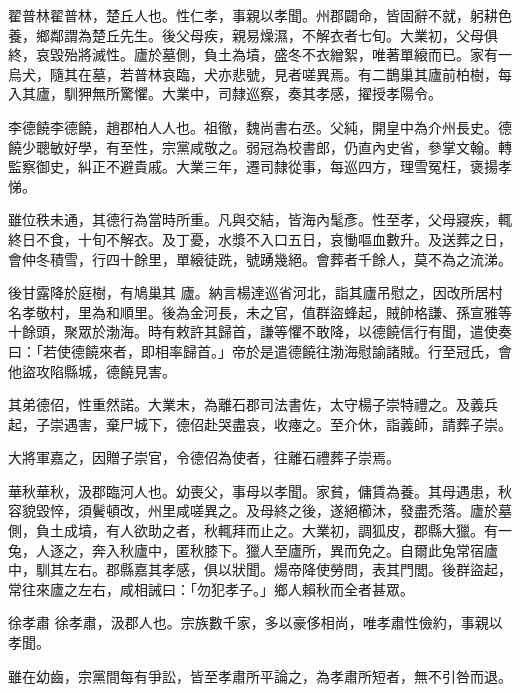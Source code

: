\begin{pinyinscope}
 翟普林翟普林，楚丘人也。性仁孝，事親以孝聞。州郡闢命，皆固辭不就，躬耕色養，鄉鄰謂為楚丘先生。後父母疾，親易燥濕，不解衣者七旬。大業初，父母俱終，哀毀殆將滅性。廬於墓側，負土為墳，盛冬不衣繒絮，唯著單縗而已。家有一烏犬，隨其在墓，若普林哀臨，犬亦悲號，見者嗟異焉。有二鵲巢其廬前柏樹，每入其廬，馴狎無所驚懼。大業中，司隸巡察，奏其孝感，擢授孝陽令。



 李德饒李德饒，趙郡柏人人也。祖徹，魏尚書右丞。父純，開皇中為介州長史。德饒少聰敏好學，有至性，宗黨咸敬之。弱冠為校書郎，仍直內史省，參掌文翰。轉監察御史，糾正不避貴戚。大業三年，遷司隸從事，每巡四方，理雪冤枉，褒揚孝悌。



 雖位秩未通，其德行為當時所重。凡與交結，皆海內髦彥。性至孝，父母寢疾，輒終日不食，十旬不解衣。及丁憂，水漿不入口五日，哀慟嘔血數升。及送葬之日，會仲冬積雪，行四十餘里，單縗徒跣，號踴幾絕。會葬者千餘人，莫不為之流涕。



 後甘露降於庭樹，有鳩巢其
 廬。納言楊達巡省河北，詣其廬吊慰之，因改所居村名孝敬村，里為和順里。後為金河長，未之官，值群盜蜂起，賊帥格謙、孫宣雅等十餘頭，聚眾於渤海。時有敕許其歸首，謙等懼不敢降，以德饒信行有聞，遣使奏曰：「若使德饒來者，即相率歸首。」帝於是遣德饒往渤海慰諭諸賊。行至冠氏，會他盜攻陷縣城，德饒見害。



 其弟德佋，性重然諾。大業末，為離石郡司法書佐，太守楊子崇特禮之。及義兵起，子崇遇害，棄尸城下，德佋赴哭盡哀，收瘞之。至介休，詣義師，請葬子崇。



 大將軍嘉之，因贈子崇官，令德佋為使者，往離石禮葬子崇焉。



 華秋華秋，汲郡臨河人也。幼喪父，事母以孝聞。家貧，傭賃為養。其母遇患，秋容貌毀悴，須鬢頓改，州里咸嗟異之。及母終之後，遂絕櫛沐，發盡禿落。廬於墓側，負土成墳，有人欲助之者，秋輒拜而止之。大業初，調狐皮，郡縣大獵。有一兔，人逐之，奔入秋廬中，匿秋膝下。獵人至廬所，異而免之。自爾此兔常宿廬中，馴其左右。郡縣嘉其孝感，俱以狀聞。煬帝降使勞問，表其門閭。後群盜起，常往來廬之左右，咸相誡曰：「勿犯孝子。」鄉人賴秋而全者甚眾。



 徐孝肅
 徐孝肅，汲郡人也。宗族數千家，多以豪侈相尚，唯孝肅性儉約，事親以孝聞。



 雖在幼齒，宗黨間每有爭訟，皆至孝肅所平論之，為孝肅所短者，無不引咎而退。




\end{pinyinscope}
